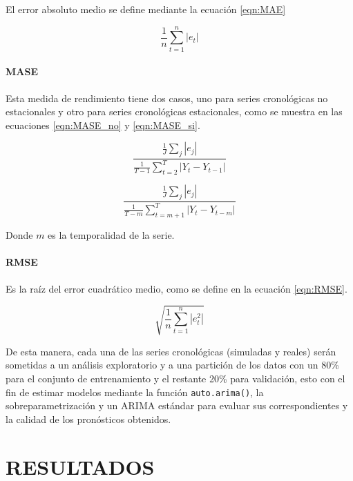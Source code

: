 \documentclass[
]{article}
\begin{document}
El error absoluto medio se define mediante la ecuación \ref{eqn:MAE}

\begin{equation}
\label{eqn:MAE}
\frac{1}{n}\sum_{t=1}^n |e_t|
\end{equation}

\paragraph{MASE}

Esta medida de rendimiento tiene dos casos, uno para series cronológicas
no estacionales y otro para series cronológicas estacionales, como se
muestra en las ecuaciones \ref{eqn:MASE_no} y \ref{eqn:MASE_si}.

\begin{equation}
\label{eqn:MASE_no}
\frac{\frac{1}{J}\sum_j|e_j|}{\frac{1}{T-1}\sum_{t=2}^T|Y_t-Y_{t-1}|}
\end{equation}

\begin{equation}
\label{eqn:MASE_si}
\frac{\frac{1}{J}\sum_j|e_j|}{\frac{1}{T-m}\sum_{t=m+1}^T|Y_t-Y_{t-m}|}
\end{equation}

Donde \(m\) es la temporalidad de la serie.

\paragraph{RMSE}

Es la raíz del error cuadrático medio, como se define en la ecuación
\ref{eqn:RMSE}.

\begin{equation}
\label{eqn:RMSE}
\sqrt{\frac{1}{n}\sum_{t=1}^n |e_t^2|}
\end{equation}

De esta manera, cada una de las series cronológicas (simuladas y reales)
serán sometidas a un análisis exploratorio y a una partición de los
datos con un 80\% para el conjunto de entrenamiento y el restante 20\%
para validación, esto con el fin de estimar modelos mediante la función
\texttt{auto.arima()}, la sobreparametrización y un ARIMA estándar para
evaluar sus correspondientes y la calidad de los pronósticos obtenidos.

\newpage

\section{RESULTADOS}
\end{document}
